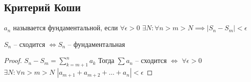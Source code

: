 \subsection{Критерий Коши}
\begin{definition}
    ${a_n}$ называется фундаментальной, если $\forall \epsilon > 0$  $\exists N: \forall n > m > N \implies |S_n - S_m| < \epsilon$
\end{definition}
\begin{theorem}
    ${S_n}$ -- сходится $\Leftrightarrow {S_n}$ -- фундаментальная
\end{theorem}
\begin{proof}
$S_n - S_m = \sum_{k = m + 1}^{n} a_{k}$
Тогда $\sum a_n$ -- сходится $\Leftrightarrow$ $\forall \epsilon > 0$  $\exists N: \forall n > m > N$
$|a_{m + 1} + a_{m + 2} + \dots + a_{n}| < \epsilon$
\end{proof}

